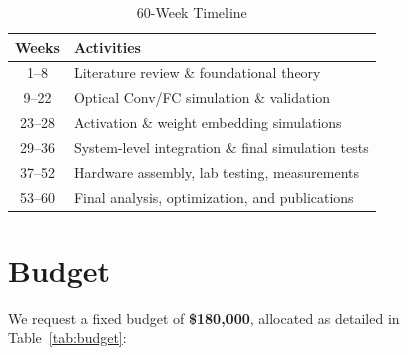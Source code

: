 \documentclass[conference]{IEEEtran}
\begin{document}
\begin{table}[h]
\centering
\caption{60-Week Timeline}
\label{tab:timeline}
\begin{tabular}{|c|p{5.5cm}|}
\hline
\textbf{Weeks} & \textbf{Activities} \\
\hline
1--8 & Literature review \& foundational theory \\
\hline
9--22 & Optical Conv/FC simulation \& validation \\
\hline
23--28 & Activation \& weight embedding simulations \\
\hline
29--36 & System-level integration \& final simulation tests \\
\hline
37--52 & Hardware assembly, lab testing, measurements \\
\hline
53--60 & Final analysis, optimization, and publications \\
\hline
\end{tabular}
\end{table}

\section{Budget}
We request a fixed budget of \textbf{\$180,000}, allocated as detailed in Table~\ref{tab:budget}:
\end{document}
